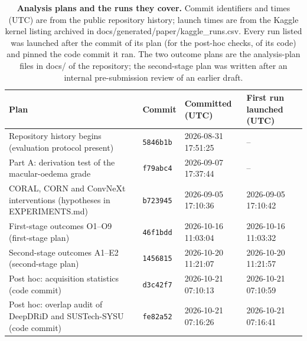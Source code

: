 \begin{table}[h]
\caption{\textbf{Analysis plans and the runs they cover.} Commit identifiers and times (UTC) are from the public repository history; launch times are from the Kaggle kernel listing archived in docs/generated/paper/kaggle\_runs.csv. Every run listed was launched after the commit of its plan (for the post-hoc checks, of its code) and pinned the code commit it ran. The two outcome plans are the analysis-plan files in docs/ of the repository; the second-stage plan was written after an internal pre-submission review of an earlier draft.}\label{tab:provenance}
\centering\scriptsize
\begin{tabular}{@{}p{5.6cm}lll@{}}
\toprule
Plan & Commit & Committed (UTC) & First run launched (UTC) \\
\midrule
Repository history begins (evaluation protocol present) & \texttt{5846b1b} & 2026-08-31 17:51:25 & -- \\
Part A: derivation test of the macular-oedema grade & \texttt{f79abc4} & 2026-09-07 17:37:44 & -- \\
CORAL, CORN and ConvNeXt interventions (hypotheses in EXPERIMENTS.md) & \texttt{b723945} & 2026-09-05 17:10:36 & 2026-09-05 17:10:42 \\
First-stage outcomes O1--O9 (first-stage plan) & \texttt{46f1bdd} & 2026-10-16 11:03:04 & 2026-10-16 11:03:32 \\
Second-stage outcomes A1--E2 (second-stage plan) & \texttt{1456815} & 2026-10-20 11:21:07 & 2026-10-20 11:21:57 \\
Post hoc: acquisition statistics (code commit) & \texttt{d3c42f7} & 2026-10-21 07:10:13 & 2026-10-21 07:10:59 \\
Post hoc: overlap audit of DeepDRiD and SUSTech-SYSU (code commit) & \texttt{fe82a52} & 2026-10-21 07:16:26 & 2026-10-21 07:16:41 \\
\bottomrule
\end{tabular}
\end{table}
